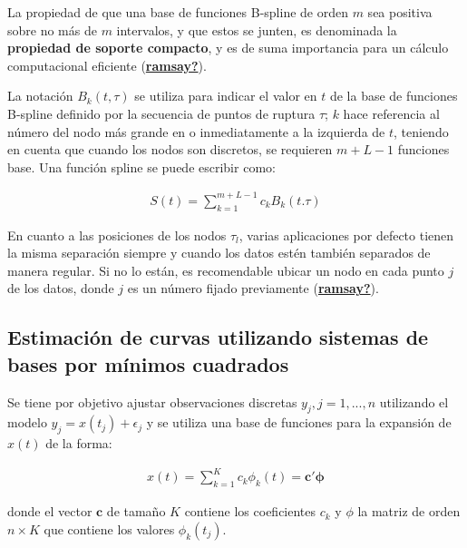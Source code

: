 \documentclass[
]{book}
\begin{document}
La propiedad de que una base de funciones B-spline de orden \(m\) sea positiva sobre no más de \(m\) intervalos, y que estos se junten, es denominada la \textbf{propiedad de soporte compacto}, y es de suma importancia para un cálculo computacional eficiente (\protect\hyperlink{ref-ramsay}{\textbf{ramsay?}}).

La notación \(B_k(t,\tau)\) se utiliza para indicar el valor en \(t\) de la base de funciones B-spline definido por la secuencia de puntos de ruptura \(\tau\); \(k\) hace referencia al número del nodo más grande en o inmediatamente a la izquierda de \(t\), teniendo en cuenta que cuando los nodos son discretos, se requieren \(m+L-1\) funciones base. Una función spline se puede escribir como:

\begin{align}
    S(t)=\sum_{k=1}^{m+L-1} {c_{k}B_{k}(t.\tau)}
\end{align}

En cuanto a las posiciones de los nodos \(\tau_l\), varias aplicaciones por defecto tienen la misma separación siempre y cuando los datos estén también separados de manera regular. Si no lo están, es recomendable ubicar un nodo en cada punto \(j\) de los datos, donde \(j\) es un número fijado previamente (\protect\hyperlink{ref-ramsay}{\textbf{ramsay?}}).

\hypertarget{estimaciuxf3n-de-curvas-utilizando-sistemas-de-bases-por-muxednimos-cuadrados}{%
\subsection*{Estimación de curvas utilizando sistemas de bases por mínimos cuadrados}\label{estimaciuxf3n-de-curvas-utilizando-sistemas-de-bases-por-muxednimos-cuadrados}}

Se tiene por objetivo ajustar observaciones discretas \(y_j,j=1,...,n\) utilizando el modelo \(y_j=x(t_j)+\epsilon_j\) y se utiliza una base de funciones para la expansión de \(x(t)\) de la forma:

\begin{align}
    x(t)=\sum_{k=1}^Kc_k\phi_k(t)=\mathbf{c'} \boldsymbol{\phi}
\end{align}

donde el vector \(\textbf{c}\) de tamaño \(K\) contiene los coeficientes \(c_k\) y \(\phi\) la matriz de orden \(n\times K\) que contiene los valores \(\phi_k(t_j)\).
\end{document}
